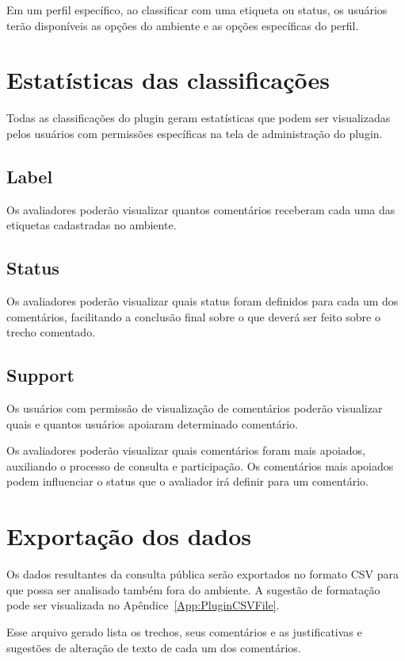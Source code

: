 \documentclass[11pt]{article}
\begin{document}
Em um perfil específico, ao classificar com uma etiqueta ou status, os
usuários terão disponíveis as opções do ambiente e as opções específicas do
perfil.

\section{Estatísticas das classificações}

Todas as classificações do plugin geram estatísticas que podem ser
visualizadas pelos usuários com permissões específicas na tela de
administração do plugin.

\subsection{Label}

Os avaliadores poderão visualizar quantos comentários receberam cada uma
das etiquetas cadastradas no ambiente.

\subsection{Status}

Os avaliadores poderão visualizar quais status foram definidos para
cada um dos comentários, facilitando a conclusão final sobre o que
deverá ser feito sobre o trecho comentado.

\subsection{Support}

Os usuários com permissão de visualização de comentários poderão
visualizar quais e quantos usuários apoiaram determinado comentário.

Os avaliadores poderão visualizar quais comentários foram mais apoiados,
auxiliando o processo de consulta e participação. Os comentários mais
apoiados podem influenciar o status que o avaliador irá definir para um
comentário.

\section{Exportação dos dados}

Os dados resultantes da consulta pública serão exportados no formato CSV
para que possa ser analisado também fora do ambiente. A sugestão de
formatação pode ser visualizada no Apêndice~\ref{App:PluginCSVFile}.

Esse arquivo gerado lista os trechos, seus comentários e as
justificativas e sugestões de alteração de texto de cada um dos
comentários.
\end{document}
